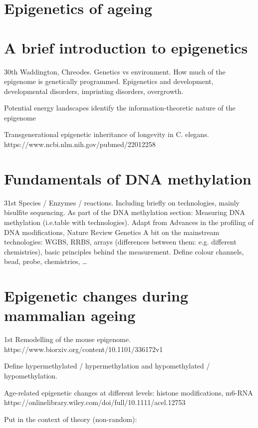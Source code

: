 \section{Epigenetics of ageing}

\section{A brief introduction to epigenetics}

30th
Waddington, Chreodes.
Genetics vs environment. How much of the epigenome is genetically programmed.
Epigenetics and development, developmental disorders, imprinting disorders, overgrowth.

Potential energy landscapes identify the information-theoretic nature of the epigenome

Transgenerational epigenetic inheritance of longevity in C. elegans.
https://www.ncbi.nlm.nih.gov/pubmed/22012258


\section{Fundamentals of DNA methylation}

31st
Species / Enzymes / reactions.
Including briefly on technologies, mainly bisulfite sequencing.
As part of the DNA methylation section: Measuring DNA methylation (i.e.table with technologies). Adapt from Advances in the profiling of DNA modifications, Nature Review Genetics
A bit on the mainstream technologies: WGBS, RRBS, arrays (differences between them: e.g. different chemistries), basic principles behind the measurement. Define colour channels, bead, probe, chemistries, …

\section{Epigenetic changes during mammalian ageing}

1st
Remodelling of the mouse epigenome. 
https://www.biorxiv.org/content/10.1101/336172v1

Define hypermethylated / hypermethylation and hypomethylated / hypomethylation.

Age-related epigenetic changes at different levels: histone modifications, m6-RNA https://onlinelibrary.wiley.com/doi/full/10.1111/acel.12753

Put in the context of theory (non-random): %


